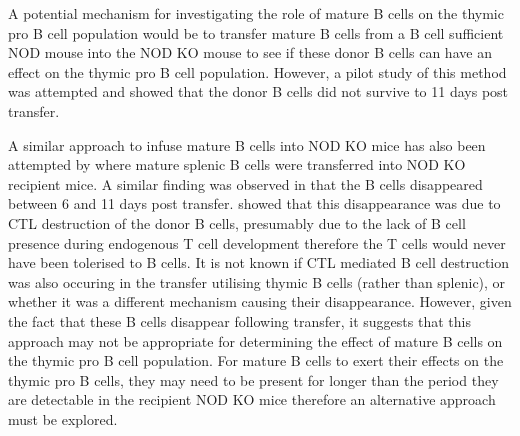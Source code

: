 A potential mechanism for investigating the role of mature B cells on the thymic pro B cell population would be to transfer mature B cells from a B cell sufficient NOD mouse into the NOD KO mouse to see if these donor B cells can have an effect on the thymic pro B cell population.
However, a pilot study of this method was attempted and showed that the donor B cells did not survive to 11 days post transfer.

A similar approach to infuse mature B cells into NOD KO mice has also been attempted by \citet{Serreze1998} where mature splenic B cells were transferred into NOD KO recipient mice. 
A similar finding was observed in that the B cells disappeared between 6 and 11 days post transfer.
\citet{Serreze1998} showed that this disappearance was due to CTL destruction of the donor B cells, presumably due to the lack of B cell presence during endogenous T cell development therefore the T cells would never have been tolerised to B cells.
It is not known if CTL mediated B cell destruction was also occuring in the transfer utilising thymic B cells (rather than splenic), or whether it was a different mechanism causing their disappearance. 
However, given the fact that these B cells disappear following transfer, it suggests that this approach may not be appropriate for determining the effect of mature B cells on the thymic pro B cell population.
For mature B cells to exert their effects on the thymic pro B cells, they may need to be present for longer than the period they are detectable in the recipient NOD KO mice therefore an alternative approach must be explored.

